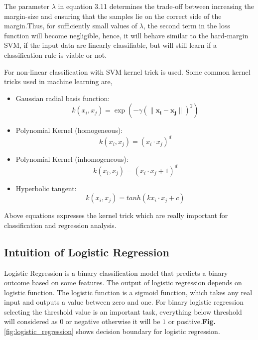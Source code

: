 The parameter $\lambda $ in equation 3.11 determines the trade-off between increasing the margin-size and ensuring that the samples lie on the correct side of the margin.Thus, for sufficiently small values of $\lambda $, the second term in the loss function will become negligible, hence, it will behave similar to the hard-margin SVM, if the input data are linearly classifiable, but will still learn if a classification rule is viable or not.
\par\noindent
For non-linear classification with SVM kernel trick is used. Some common kernel tricks used in machine learning are,
\begin{itemize}
    \item Gaussian radial basis function:
    \begin{equation}
         k(x_{i}, x_{j}) = \exp{(-\gamma(\lVert \mathbf{x_{i}-x_{j}} \rVert)^2)}
    \end{equation}
    \item Polynomial Kernel (homogeneous):
    \begin{equation}
        k(x_{i}, x_{j}) = (x_{i}\cdot x_{j})^d
    \end{equation}
     \item Polynomial Kernel (inhomogeneous):
     \begin{equation}
         k(x_{i}, x_{j}) = (x_{i}\cdot x_{j}+1)^d
     \end{equation}
    \item Hyperbolic tangent:
    \begin{equation}
       k(x_{i}, x_{j}) = tanh(kx_{i}\cdot x_{j}+c) 
    \end{equation}
\end{itemize}
Above equations expresses the kernel trick which are really important for classification and regression analysis.

\subsection{Intuition of Logistic Regression}
Logistic Regression is a binary classification model that predicts a binary outcome based on some features. The output of logistic regression depends on logistic function. The logistic function is a sigmoid function, which takes any real input and outputs a value between zero and one. For binary logistic regression selecting the threshold value is an important task, everything below threshold will considered as $0$ or negative otherwise it will be $1$ or  positive.\textbf{Fig.} \ref{fig:logistic_regression} shows decision boundary for logistic regression.  

